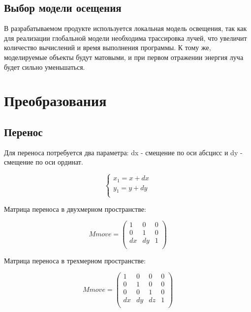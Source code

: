 \subsection{Выбор модели осещения}
В разрабатываемом продукте используется локальная модель освещения, так как для реализации глобальной модели необходима трассировка лучей, что увеличит количество вычислений и время выполнения программы. К тому же, моделируемые объекты будут матовыми, и при первом отражении энергия луча будет сильно уменьшаться.





\section {Преобразования}

\subsection {Перенос}

Для переноса потребуется два параметра: dx - смещение по оси абсцисс и dy - смещение по оси ординат.

\begin{equation}
	{\begin{cases}
			x_1 = x + dx \\
			y_1 = y + dy \\
		\end{cases}}
\end{equation}

Матрица переноса в двухмерном пространстве:

\begin{equation}
	Mmove = \left(
	\begin{array}{cccc}
			1  & 0  & 0 \\
			0  & 1  & 0 \\
			dx & dy & 1 \\
		\end{array}
	\right)
\end{equation}

Матрица переноса в трехмерном пространстве:

\begin{equation}
	Mmove = \left(
	\begin{array}{cccc}
			1  & 0  & 0  & 0 \\
			0  & 1  & 0  & 0 \\
			0  & 0  & 1  & 0 \\
			dx & dy & dz & 1 \\
		\end{array}
	\right)
\end{equation}

